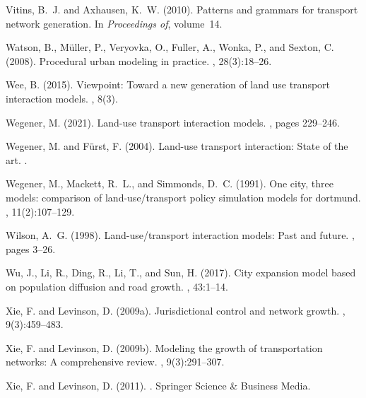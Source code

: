 \documentclass[10pt]{article}
\begin{document}
\begin{thebibliography}{}
Vitins, B.~J. and Axhausen, K.~W. (2010).
\newblock Patterns and grammars for transport network generation.
\newblock In {\em Proceedings of}, volume~14.

Watson, B., M{\"u}ller, P., Veryovka, O., Fuller, A., Wonka, P., and Sexton, C.
  (2008).
\newblock Procedural urban modeling in practice.
, 28(3):18--26.

Wee, B. (2015).
\newblock Viewpoint: Toward a new generation of land use transport interaction
  models.
, 8(3).

Wegener, M. (2021).
\newblock Land-use transport interaction models.
, pages 229--246.

Wegener, M. and F{\"u}rst, F. (2004).
\newblock Land-use transport interaction: State of the art.
.

Wegener, M., Mackett, R.~L., and Simmonds, D.~C. (1991).
\newblock One city, three models: comparison of land-use/transport policy
  simulation models for dortmund.
, 11(2):107--129.

Wilson, A.~G. (1998).
\newblock Land-use/transport interaction models: Past and future.
, pages 3--26.

Wu, J., Li, R., Ding, R., Li, T., and Sun, H. (2017).
\newblock City expansion model based on population diffusion and road growth.
, 43:1--14.

Xie, F. and Levinson, D. (2009a).
\newblock Jurisdictional control and network growth.
, 9(3):459--483.

Xie, F. and Levinson, D. (2009b).
\newblock Modeling the growth of transportation networks: A comprehensive
  review.
, 9(3):291--307.

Xie, F. and Levinson, D. (2011).
.
\newblock Springer Science \& Business Media.


\end{thebibliography}
\end{document}
